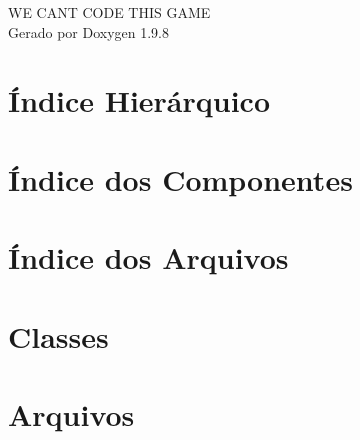 \documentclass[twoside]{book}
\newcommand{\+}{\discretionary{\mbox{\scriptsize$\hookleftarrow$}}{}{}}
\newcommand{\clearemptydoublepage}{%
    \newpage{\pagestyle{empty}\cleardoublepage}%
  }
\begin{document}
  \raggedbottom
    \hypersetup{pageanchor=false,
                bookmarksnumbered=true,
                pdfencoding=unicode
               }
  \begin{titlepage}
  \vspace*{7cm}
  \begin{center}%
  {\Large WE CANT CODE THIS GAME}\\
  \vspace*{1cm}
  {\large Gerado por Doxygen 1.9.8}\\
  \end{center}
  \end{titlepage}
  \clearemptydoublepage
  \tableofcontents
  \clearemptydoublepage
  \hypersetup{pageanchor=true}
\chapter{Índice Hierárquico}

\chapter{Índice dos Componentes}

\chapter{Índice dos Arquivos}

\chapter{Classes}














\chapter{Arquivos}




























  \backmatter
  \newpage
  \clearemptydoublepage
  \printindex
\end{document}
